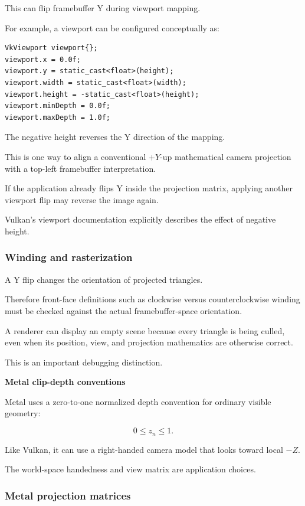 This can flip framebuffer Y during viewport mapping.

For example, a viewport can be configured conceptually as:

\begin{verbatim}
VkViewport viewport{};
viewport.x = 0.0f;
viewport.y = static_cast<float>(height);
viewport.width = static_cast<float>(width);
viewport.height = -static_cast<float>(height);
viewport.minDepth = 0.0f;
viewport.maxDepth = 1.0f;
\end{verbatim}

The negative height reverses the Y direction of the mapping.

This is one way to align a conventional \(+Y\)-up mathematical camera projection with a top-left framebuffer interpretation.

If the application already flips Y inside the projection matrix, applying another viewport flip may reverse the image again.

Vulkan's viewport documentation explicitly describes the effect of negative height. 

\subsubsection{Winding and rasterization}\label{winding-and-rasterization}

A Y flip changes the orientation of projected triangles.

Therefore front-face definitions such as clockwise versus counterclockwise winding must be checked against the actual framebuffer-space orientation.

A renderer can display an empty scene because every triangle is being culled, even when its position, view, and projection mathematics are otherwise correct.

This is an important debugging distinction.

\textbf{Metal clip-depth conventions}

Metal uses a zero-to-one normalized depth convention for ordinary visible geometry:

\[
 \boxed{ 0\le z_n\le1 }.
\]

Like Vulkan, it can use a right-handed camera model that looks toward local \(-Z\).

The world-space handedness and view matrix are application choices.

\subsubsection{Metal projection matrices}\label{metal-projection-matrices}

